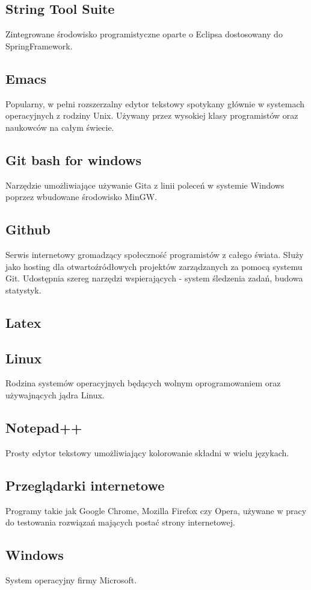 \documentclass[11pt,a4paper,polish,thesis]{dcsbook}
\begin{document}
\subsection{String Tool Suite}
Zintegrowane środowisko programistyczne oparte o Eclipsa dostosowany do SpringFramework.
\subsection{Emacs}
Popularny, w pełni rozszerzalny edytor tekstowy spotykany głównie w systemach operacyjnych z rodziny Unix. Używany przez wysokiej klasy programistów oraz naukowców na całym świecie.
\subsection{Git bash for windows}
Narzędzie umożliwiające używanie Gita z linii poleceń w systemie Windows poprzez wbudowane środowisko MinGW.
\subsection{Github}
Serwis internetowy gromadzący społeczność programistów z całego świata. Służy jako hosting dla otwartoźródłowych projektów zarządzanych za pomocą systemu Git.
Udostępnia szereg narzędzi wspierających - system śledzenia zadań, budowa statystyk.
\subsection{Latex}

\subsection{Linux}
Rodzina systemów operacyjnych będących wolnym oprogramowaniem oraz używajnących jądra Linux.
\subsection{Notepad++}
Prosty edytor tekstowy umożliwiający kolorowanie składni w wielu językach.
\subsection{Przeglądarki internetowe}
Programy takie jak Google Chrome, Mozilla Firefox czy Opera, używane w pracy do testowania rozwiązań mających postać strony internetowej.
\subsection{Windows}
System operacyjny firmy Microsoft.
\end{document}
